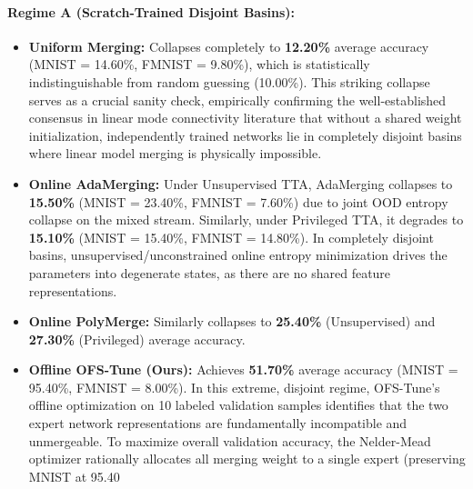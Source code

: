 \paragraph{Regime A (Scratch-Trained Disjoint Basins):}
\begin{itemize}
    \item \textbf{Uniform Merging:} Collapses completely to \textbf{12.20\%} average accuracy (MNIST = 14.60\%, FMNIST = 9.80\%), which is statistically indistinguishable from random guessing (10.00\%).
This striking collapse serves as a crucial sanity check, empirically confirming the well-established consensus in linear mode connectivity literature that without a shared weight initialization, independently trained networks lie in completely disjoint basins where linear model merging is physically impossible.
    \item \textbf{Online AdaMerging:} Under Unsupervised TTA, AdaMerging collapses to \textbf{15.50\%} (MNIST = 23.40\%, FMNIST = 7.60\%) due to joint OOD entropy collapse on the mixed stream.
Similarly, under Privileged TTA, it degrades to \textbf{15.10\%} (MNIST = 15.40\%, FMNIST = 14.80\%).
In completely disjoint basins, unsupervised/unconstrained online entropy minimization drives the parameters into degenerate states, as there are no shared feature representations.
    \item \textbf{Online PolyMerge:} Similarly collapses to \textbf{25.40\%} (Unsupervised) and \textbf{27.30\%} (Privileged) average accuracy.
    \item \textbf{Offline OFS-Tune (Ours):} Achieves \textbf{51.70\%} average accuracy (MNIST = 95.40\%, FMNIST = 8.00\%).
In this extreme, disjoint regime, OFS-Tune's offline optimization on 10 labeled validation samples identifies that the two expert network representations are fundamentally incompatible and unmergeable.
To maximize overall validation accuracy, the Nelder-Mead optimizer rationally allocates all merging weight to a single expert (preserving MNIST at 95.40%
\end{itemize}

